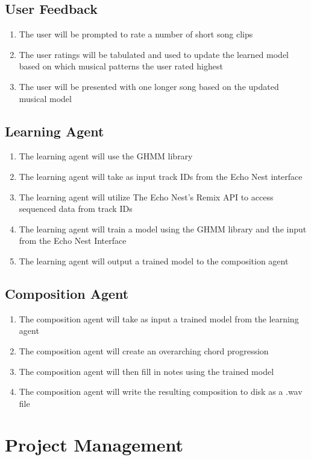 \documentclass{article}
\begin{document}
\subsection{User Feedback}
\begin{enumerate}
\item The user will be prompted to rate a number of short song clips
\item The user ratings will be tabulated and used to update the learned model based on which musical patterns the user rated highest
\item The user will be presented with one longer song based on the updated musical model
\end{enumerate}

\subsection{Learning Agent}
\begin{enumerate}
\item The learning agent will use the GHMM library
\item The learning agent will take as input track IDs from the Echo Nest interface
\item The learning agent will utilize The Echo Nest's Remix API \cite{Remix} to access sequenced data from track IDs
\item The learning agent will train a model \cite{GHMM} using the GHMM library and the input from the Echo Nest Interface
\item The learning agent will output a trained model to the composition agent
\end{enumerate}

\subsection{Composition Agent}
\begin{enumerate}
\item The composition agent will take as input a trained model from the learning agent
\item The composition agent will create an overarching chord progression
\item The composition agent will then fill in notes using the trained model
\item The composition agent will write the resulting composition to disk as a .wav file
\end{enumerate}

\section{Project Management}
\end{document}
